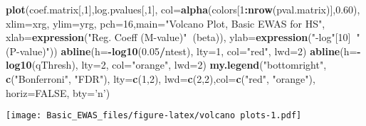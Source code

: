 \documentclass[]{article}
\newenvironment{Shaded}{\begin{snugshade}}{\end{snugshade}}
\newcommand{\KeywordTok}[1]{\textcolor[rgb]{0.13,0.29,0.53}{\textbf{#1}}}
\newcommand{\DataTypeTok}[1]{\textcolor[rgb]{0.13,0.29,0.53}{#1}}
\newcommand{\DecValTok}[1]{\textcolor[rgb]{0.00,0.00,0.81}{#1}}
\newcommand{\FloatTok}[1]{\textcolor[rgb]{0.00,0.00,0.81}{#1}}
\newcommand{\StringTok}[1]{\textcolor[rgb]{0.31,0.60,0.02}{#1}}
\newcommand{\OtherTok}[1]{\textcolor[rgb]{0.56,0.35,0.01}{#1}}
\newcommand{\OperatorTok}[1]{\textcolor[rgb]{0.81,0.36,0.00}{\textbf{#1}}}
\newcommand{\NormalTok}[1]{#1}
\begin{document}
\begin{Shaded}
\begin{Highlighting}[]
\KeywordTok{plot}\NormalTok{(coef.matrix[,}\DecValTok{1}\NormalTok{],log.pvalues[,}\DecValTok{1}\NormalTok{], }\DataTypeTok{col=}\KeywordTok{alpha}\NormalTok{(colors[}\DecValTok{1}\OperatorTok{:}\KeywordTok{nrow}\NormalTok{(pval.matrix)],}\FloatTok{0.60}\NormalTok{),}
     \DataTypeTok{xlim=}\NormalTok{xrg, }\DataTypeTok{ylim=}\NormalTok{yrg, }\DataTypeTok{pch=}\DecValTok{16}\NormalTok{,}\DataTypeTok{main=}\StringTok{"Volcano Plot, Basic EWAS for HS"}\NormalTok{,}
     \DataTypeTok{xlab=}\KeywordTok{expression}\NormalTok{(}\StringTok{"Reg. Coeff (M-value)"}\OperatorTok{~}\NormalTok{(beta)), }
     \DataTypeTok{ylab=}\KeywordTok{expression}\NormalTok{(}\StringTok{"-log"}\NormalTok{[}\DecValTok{10}\NormalTok{]}\OperatorTok{~}\StringTok{"(P-value)"}\NormalTok{))}
\KeywordTok{abline}\NormalTok{(}\DataTypeTok{h=}\OperatorTok{-}\KeywordTok{log10}\NormalTok{(}\FloatTok{0.05}\OperatorTok{/}\NormalTok{ntest), }\DataTypeTok{lty=}\DecValTok{1}\NormalTok{, }\DataTypeTok{col=}\StringTok{"red"}\NormalTok{, }\DataTypeTok{lwd=}\DecValTok{2}\NormalTok{)}
\KeywordTok{abline}\NormalTok{(}\DataTypeTok{h=}\OperatorTok{-}\KeywordTok{log10}\NormalTok{(qThresh), }\DataTypeTok{lty=}\DecValTok{2}\NormalTok{, }\DataTypeTok{col=}\StringTok{"orange"}\NormalTok{, }\DataTypeTok{lwd=}\DecValTok{2}\NormalTok{)}
\KeywordTok{my.legend}\NormalTok{(}\StringTok{"bottomright"}\NormalTok{, }\KeywordTok{c}\NormalTok{(}\StringTok{"Bonferroni"}\NormalTok{, }\StringTok{"FDR"}\NormalTok{), }\DataTypeTok{lty=}\KeywordTok{c}\NormalTok{(}\DecValTok{1}\NormalTok{,}\DecValTok{2}\NormalTok{),}
          \DataTypeTok{lwd=}\KeywordTok{c}\NormalTok{(}\DecValTok{2}\NormalTok{,}\DecValTok{2}\NormalTok{),}\DataTypeTok{col=}\KeywordTok{c}\NormalTok{(}\StringTok{"red"}\NormalTok{, }\StringTok{"orange"}\NormalTok{),}
          \DataTypeTok{horiz=}\OtherTok{FALSE}\NormalTok{, }\DataTypeTok{bty=}\StringTok{'n'}\NormalTok{)}
\end{Highlighting}
\end{Shaded}

\texttt{[image: Basic\_EWAS\_files/figure-latex/volcano plots-1.pdf]}
\end{document}

